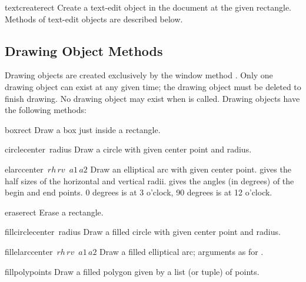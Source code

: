 \begin{funcdesc}{textcreate}{rect}
Create a text-edit object in the document at the given rectangle.
Methods of text-edit objects are described below.
\end{funcdesc}

\subsection{Drawing Object Methods}

Drawing objects are created exclusively by the window method
.
Only one drawing object can exist at any given time; the drawing object
must be deleted to finish drawing.
No drawing object may exist when
is called.
Drawing objects have the following methods:

\renewcommand{\indexsubitem}{(drawing method)}
\begin{funcdesc}{box}{rect}
Draw a box just inside a rectangle.
\end{funcdesc}

\begin{funcdesc}{circle}{center\, radius}
Draw a circle with given center point and radius.
\end{funcdesc}

\begin{funcdesc}{elarc}{center\, \(rh\, rv\)\, \(a1\, a2\)}
Draw an elliptical arc with given center point.
gives the half sizes of the horizontal and vertical radii.
gives the angles (in degrees) of the begin and end points.
0 degrees is at 3 o'clock, 90 degrees is at 12 o'clock.
\end{funcdesc}

\begin{funcdesc}{erase}{rect}
Erase a rectangle.
\end{funcdesc}

\begin{funcdesc}{fillcircle}{center\, radius}
Draw a filled circle with given center point and radius.
\end{funcdesc}

\begin{funcdesc}{fillelarc}{center\, \(rh\, rv\)\, \(a1\, a2\)}
Draw a filled elliptical arc; arguments as for .
\end{funcdesc}

\begin{funcdesc}{fillpoly}{points}
Draw a filled polygon given by a list (or tuple) of points.
\end{funcdesc}

